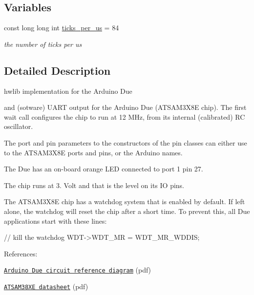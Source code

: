\subsection*{Variables}
\begin{DoxyCompactItemize}
\item 
const long long int \hyperlink{namespacedue_af3604632f92cd8ee84f9ba4ca8d51349}{ticks\+\_\+per\+\_\+us} = 84\hypertarget{namespacedue_af3604632f92cd8ee84f9ba4ca8d51349}{}\label{namespacedue_af3604632f92cd8ee84f9ba4ca8d51349}

\begin{DoxyCompactList}\small\item\em the number of ticks per us \end{DoxyCompactList}\end{DoxyCompactItemize}


\subsection{Detailed Description}
hwlib implementation for the Arduino Due 

 and (sotware) U\+A\+RT output for the Arduino Due (A\+T\+S\+A\+M3\+X8E chip). The first wait call configures the chip to run at 12 M\+Hz, from its internal (calibrated) RC oscillator.

The port and pin parameters to the constructors of the pin classes can either use to the A\+T\+S\+A\+M3\+X8E ports and pins, or the Arduino names.

The Due has an on-\/board orange L\+ED connected to port 1 pin 27.

The chip runs at 3. Volt and that is the level on its IO pins.



The A\+T\+S\+A\+M3\+X8E chip has a watchdog system that is enabled by default. If left alone, the watchdog will reset the chip after a short time. To prevent this, all Due applications start with these lines\+: 
\begin{DoxyCode}
\textcolor{comment}{// kill the watchdog}
WDT->WDT\_MR = WDT\_MR\_WDDIS;
\end{DoxyCode}


References\+:
\begin{DoxyItemize}
\item \href{https://www.arduino.cc/en/uploads/Main/arduino-uno-schematic.pdf}{\tt Arduino Due circuit reference diagram} (pdf)
\item \href{http://www.atmel.com/images/atmel-11057-32-bit-cortex-m3-microcontroller-sam3x-sam3a_datasheet.pdf}{\tt A\+T\+S\+A\+M38\+XE datasheet} (pdf) 
\end{DoxyItemize}

